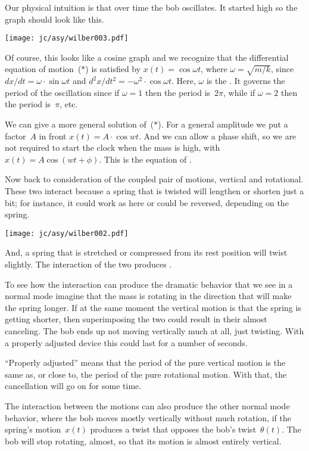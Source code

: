 Our physical intuition is that over time the bob oscillates.
It started high so 
the graph should look like this.
\begin{center}
  \texttt{[image: jc/asy/wilber003.pdf]}
\end{center}
Of course, this looks like a cosine graph and we recognize 
that the differential equation of motion~($*$) is satisfied by
$x(t)=\cos \omega t$, where $\omega=\sqrt{m/k}$,
since $dx/dt=\omega\cdot \sin \omega t$
and $d^2x/dt^2=-\omega^2\cdot \cos \omega t$.
Here, $\omega$ is the .
It governs the period of the oscillation since if $\omega=1$ then the
period is~$2\pi$, while if $\omega=2$ then the period is~$\pi$, etc.

We can give a more general solution of~($*$).
For a general amplitude we put a factor~$A$ in front
$x(t)=A\cdot \cos wt$.
And we can allow a phase shift, 
so we are not required to start the clock when the
mass is high, with 
$x(t)=A\cos (wt+\phi)$.
This is the equation of .

Now back to consideration of the coupled pair of motions, 
vertical and rotational.
These two interact because a spring that is twisted will 
lengthen or shorten just a bit;
for instance, it could work as here or could be reversed, depending on the
spring.  
\begin{center}
  \texttt{[image: jc/asy/wilber002.pdf]}
\end{center}
And, a spring that is stretched or compressed from its rest
position will twist slightly.
The interaction of the two produces .

To see how the interaction can produce the dramatic behavior that
we see in a normal mode
imagine that the mass is rotating in the direction that will 
make the spring longer.
If at the same moment the vertical motion is that the spring 
is getting shorter, 
then superimposing the two
could result in their almost canceling.
The bob ends up not moving vertically much at all, just twisting.
With a properly adjusted device this could last for a number of seconds.

``Properly adjusted'' means that  
the period of the pure vertical motion is the same as, 
or close to, the period of the pure rotational motion.
With that, the cancellation will go on for some time. 

The interaction between the motions can also produce the other normal mode 
behavior, where the bob moves mostly vertically without much rotation,
if the spring's motion~$x(t)$ 
produces a twist that opposes the bob's twist~$\theta(t)$.
The bob will stop rotating, almost, so that
its motion is almost entirely vertical.


